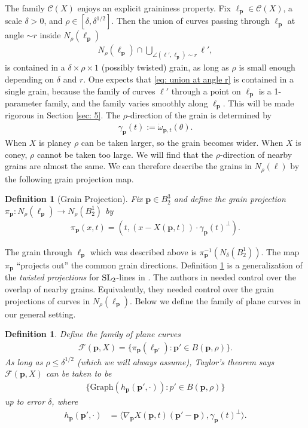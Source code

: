 \documentclass[12pt]{amsart}
\numberwithin{equation}{section}
\newtheorem{definition}[lemma]{Definition}
\newcommand{\1}{\mathbbm{1}}
\newcommand{\p}{\mathbf p}
\begin{document}
The family $\mathcal C(X)$ enjoys an explicit graininess property. Fix $\ell_{\p} \in \mathcal C(X)$, a scale $\delta > 0$, and $\rho \in [\delta, \delta^{1/2}]$. Then the union of curves passing through $\ell_{\p}$ at angle $\sim r$ inside $N_\rho(\ell_\p)$ 
\begin{align}\label{eq: union at angle r}
    N_\rho(\ell_\p) \cap \bigcup_{\angle(\ell', \ell_\p) \sim r} \ell',
\end{align}
is contained in a $\delta \times \rho \times 1$ (possibly twisted) grain, as long as $\rho$ is small enough depending on $\delta$ and $r$. One expects that \eqref{eq: union at angle r} is contained in a single grain, because the family of curves $\ell'$ through a point on $\ell_\p$ is a 1-parameter family, and the family varies smoothly along $\ell_\p$. This will be made rigorous in Section \ref{sec: 5}. The $\rho$-direction of the grain is determined by 
\begin{align}
    \gamma_\p(t) := \dot \omega_{\p,t}(\theta). 
\end{align}
When $X$ is planey $\rho$ can be taken larger, so the grain becomes wider. When $X$ is coney, $\rho$ cannot be taken too large. We will find that the $\rho$-direction of nearby grains are almost the same. We can therefore describe the grains in $N_\rho(\ell)$ by the following grain projection map.

\begin{definition}[Grain Projection]\label{def: grain projection}
    Fix $\p \in B_2^3$ and define the grain projection $\pi_\p : N_\rho(\ell_\p) \to N_\rho(B_2^1)$ by 
    \begin{align}
        \pi_{\p}(x,t) = (t, (x - X(\p,t)) \cdot \gamma_{\p}(t)^\perp). 
    \end{align}
\end{definition}
The grain through $\ell_\p$ which was described above is $\pi_\p^{-1}(N_\delta(B_2^1))$. The map $\pi_\p$ ``projects out'' the common grain directions. 
Definition \ref{def: grain projection} is a generalization of the \emph{twisted projections} for $\rm{S}L_2$-lines in \cite{KWZ}. The authors in \cite{KWZ} needed control over the overlap of nearby grains. Equivalently, they needed control over the grain projections of curves in $N_{\rho}(\ell_\p)$. Below we define the family of plane curves in our general setting.

\begin{definition}
    Define the family of plane curves 
    \begin{align}
        \mathcal F(\p, X) = \{\pi_\p(\ell_{\p'}) : \p' \in B(\p, \rho)\}. 
    \end{align}
    As long as $\rho \leq \delta^{1/2}$ (which we will always assume), Taylor's theorem says $\mathcal F(\p,X)$ can be taken to be
    \begin{align}
        \{\mathrm{Graph}(h_\p(\p',\cdot)) : p'\in B(\p, \rho)\}
    \end{align}
    up to error $\delta$, where 
    \begin{align}
        h_\p(\p', \cdot) &= \langle \nabla_\p X(\p,t) (\p' - \p), \gamma_\p(t)^\perp \rangle. 
    \end{align}
\end{definition}
\end{document}
